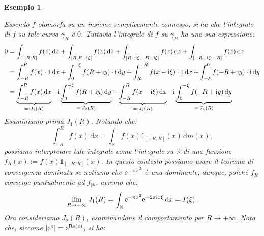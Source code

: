 \documentclass[11pt]{book}
\theoremstyle{Definizione}
\theoremstyle{TeoremaProposizioneLemmaCorollarioCongettura}
\theoremstyle{OsservazioneNotaEsempio}
\newtheorem{myes}{Esempio}[section]
\newcommand{\R}{\mathbb{R}}
\newcommand{\sub}[2]{{#1}_{|{#2}}}
\renewcommand{\Re}{\textup{Re}}
\renewcommand{\i}{\textup{i}}
\newcommand{\e}{\textup{e}}
\renewcommand{\d}{\mathrm{d}}
\newcommand{\dz}{\,\d z}
\newcommand{\dx}{\,\d x}
\newcommand{\dy}{\,\d y}
\newcommand{\uno}[1]{\mathds{1}_{#1}}
\newcommand{\frecciaIn}{
\tikz \draw[-latex] (-1pt,0) -- (1pt,0);
}
\newcommand{\frecciaOut}{
\tikz \draw[latex-] (-1pt,0) -- (1pt,0);
}
\begin{document}
\begin{myes}
\begin{center}
\end{center}
Essendo $f$ olomorfa su un insieme semplicemente connesso, si ha che l'integrale di $f$ su tale curva $\gamma_R$ è $0$. Tuttavia l'integrale di $f$ su $\gamma_R$ ha una sua espressione:
\begin{align}
0 &= \int_{[-R,R]} f(z)\dz + \int_{[R,R-\i\xi]} f(z)\dz + \int_{[R-\i\xi,-R-\i\xi]} f(z)\dz + \int_{[-R-\i\xi,-R]} f(z)\dz \nonumber \\
&= \int_{-R}^{R} f(x)\cdot 1\dx + \int_{0}^{-\xi} f(R+\i y)\cdot \i \dy + \int_{R}^{-R} f(x-\i\xi) \cdot 1\dx + \int_{-\xi}^{0} f(-R +\i y) \cdot \i \dy\nonumber\\
&= \underbrace{\int_{-R}^{R} f(x)\dx}_{=: J_1(R)} + \i\underbrace{\int_{0}^{-\xi} f(R+\i y) \dy}_{=: J_2(R)} - \underbrace{\int_{-R}^{R} f(x-\i\xi)\dx}_{=: J_3(R)} - \i \underbrace{\int_{0}^{-\xi} f(-R+\i y)\dy}_{=: J_4(R)} \label{eq:EsempioTrasformataDiFourierClaudiaMiStaSullePalle}
\end{align}
Esaminiamo prima $J_1(R)$. Notando che:
$$
\int_{-R}^{R} f(x) \dx = \int_\R f(x)\uno{[-R,R]}(x)\,\d m(x),
$$
possiamo interpretare tale integrale come l'integrale su $\R$ di una funzione $f_R(x):= f(x) \uno{[-R,R]}(x)$. In questo contesto possiamo usare il teorema di convergenza dominata se notiamo che $\e^{-\pi x^2}$ è una dominante, dunque, poiché $f_R$ converge puntualmente ad $\sub{f}{\R}$, avremo che:
$$
\lim_{R \to +\infty} J_1(R) = \int_\R \e^{-\pi x^2} \e^{-2\pi \i x\xi} \dx = I(\xi).
$$
Ora consideriamo $J_2(R)$, esaminandone il comportamento per $R \to +\infty$. Nota che, siccome $|\e^z| = \e^{\Re(z)}$, si ha:

\end{myes}
\end{document}
